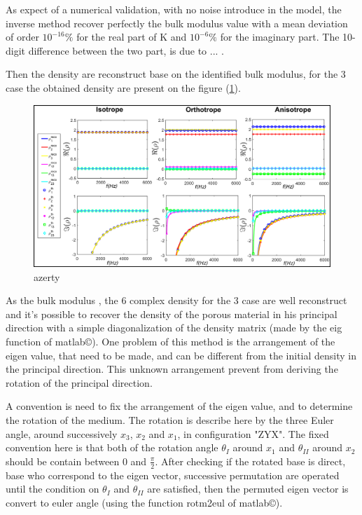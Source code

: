 \documentclass{article}
\begin{document}
    As expect of a numerical validation, with no noise introduce in the model, the inverse method recover perfectly the bulk modulus value with a mean deviation of order $10^{-16}\%$ for the real part of K and $10^{-6}\%$ for the imaginary part. The 10-digit difference between the two part, is due to ... .
    
    Then the density are reconstruct base on the identified bulk modulus,  for the 3 case the obtained density are present on the figure (\ref{Grph_rho_rot}).
    \begin{figure}[ht!]
        \centering
        \includegraphics[scale=0.4]{Density_rot.png}
        \caption{azerty}
        \label{Grph_rho_rot}
    \end{figure}
    
    As the bulk modulus , the 6 complex density for the 3 case are well reconstruct and it's possible to recover the density of the porous material in his principal direction with a simple diagonalization of the density matrix (made by the eig function of matlab\copyright). One problem of this method is the arrangement of the eigen value, that need to be made, and can be different from the initial density in the principal direction. This unknown arrangement prevent from deriving the rotation of the principal direction.
    
    A convention is need to fix the arrangement of the eigen value, and to determine the rotation of the medium. The rotation is describe here by the three Euler angle, around successively $x_3$, $x_2$ and $x_1$, in configuration "ZYX". The fixed convention here is that both of  the rotation angle $\theta_I$ around $x_1$ and $\theta_{II}$ around $x_2$ should be contain between $0$ and $\frac{\pi}{2}$. After checking if the rotated base is direct, base who correspond to the eigen vector, successive permutation are operated until the condition on $\theta_I$ and $\theta_{II}$ are satisfied, then the permuted eigen vector is convert to euler angle (using the function rotm2eul of matlab\copyright).
    
\end{document}
